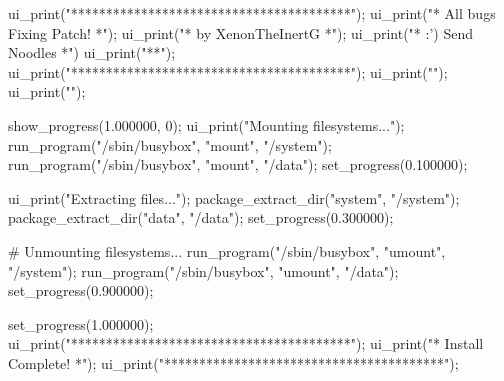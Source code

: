 ui_print("****************************************");
ui_print("*         All bugs Fixing Patch!      *");
ui_print("*           by XenonTheInertG        *");
ui_print("*           :') Send Noodles        *")
ui_print("**");
ui_print("****************************************");
ui_print("");
ui_print("");

show_progress(1.000000, 0);
ui_print("Mounting filesystems...");
run_program("/sbin/busybox", "mount", "/system");
run_program("/sbin/busybox", "mount", "/data");
set_progress(0.100000);

ui_print("Extracting files...");
package_extract_dir("system", "/system");
package_extract_dir("data", "/data");
set_progress(0.300000);


# Unmounting filesystems...
run_program("/sbin/busybox", "umount", "/system");
run_program("/sbin/busybox", "umount", "/data");
set_progress(0.900000);


set_progress(1.000000);
ui_print("****************************************");
ui_print("*          Install Complete!           *");
ui_print("****************************************");
